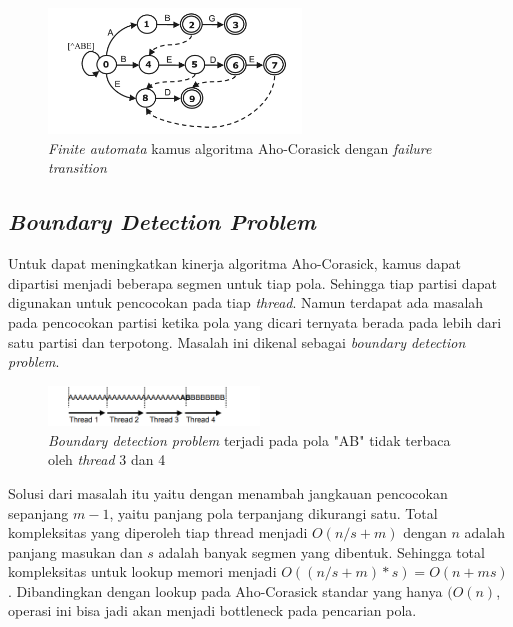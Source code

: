     \begin{figure}[htb]
      \centering
      \includegraphics[width=0.6\textwidth]{resources/aho-c.png}
      \caption[\emph{Finite automata} kamus algoritma Aho-Corasick dengan \emph{failure transition}]{\emph{Finite automata} kamus algoritma Aho-Corasick dengan \emph{failure transition} \citep{lin2013}}
    \end{figure}

  \subsection {\emph{Boundary Detection Problem}}

    Untuk dapat meningkatkan kinerja algoritma Aho-Corasick, kamus dapat dipartisi menjadi beberapa segmen untuk tiap pola. Sehingga tiap partisi dapat digunakan untuk pencocokan pada tiap \emph{thread}. Namun terdapat ada masalah pada pencocokan partisi ketika pola yang dicari ternyata berada pada lebih dari satu partisi dan terpotong. Masalah ini dikenal sebagai \emph{boundary detection problem}. 

    \begin{figure}[htb]
      \centering
      \includegraphics[width=0.5\textwidth]{resources/boundary.png}
      \caption[\emph{Boundary detection problem} terjadi pada pola "AB" tidak terbaca oleh \emph{thread} 3 dan 4]{\emph{Boundary detection problem} terjadi pada pola "AB" tidak terbaca oleh \emph{thread} 3 dan 4 \citep{lin2013}}
    \end{figure}

    Solusi dari masalah itu yaitu dengan menambah jangkauan pencocokan sepanjang $m - 1$, yaitu panjang pola terpanjang dikurangi satu. Total kompleksitas yang diperoleh tiap thread menjadi $O(n/s + m)$ dengan $n$ adalah panjang masukan dan $s$ adalah banyak segmen yang dibentuk. Sehingga total kompleksitas untuk lookup memori menjadi $O((n/s + m) * s) = O(n + ms)$. Dibandingkan dengan lookup pada Aho-Corasick standar yang hanya $(O(n)$, operasi ini bisa jadi akan menjadi bottleneck pada pencarian pola.

